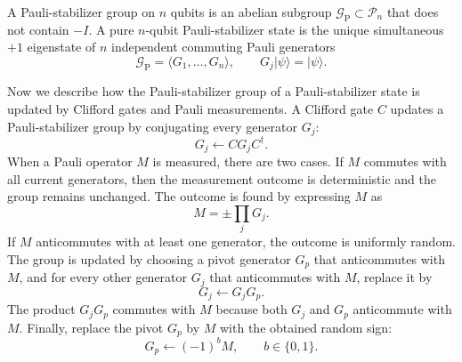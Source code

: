 \documentclass[
 reprint,
 amsmath,amssymb,
 pra,superscriptaddress, nofootinbib
]{revtex4-2}
\theoremstyle{definition}
\theoremstyle{plain}
\newcommand{\cP}{\mathcal P}
\begin{document}
A Pauli-stabilizer group on $n$ qubits is an abelian subgroup $\mathcal{G}_\mathrm{P}\subset\cP_n$ that does not contain $-I$. A pure $n$-qubit Pauli-stabilizer state is the unique simultaneous $+1$ eigenstate of $n$ independent commuting Pauli generators
\begin{equation}
\mathcal{G}_\mathrm{P}=\langle G_1,\ldots,G_n\rangle,
\qquad G_j|\psi\rangle=|\psi\rangle.
\end{equation}

Now we describe how the Pauli-stabilizer group of a Pauli-stabilizer state is updated by Clifford gates and Pauli measurements.
A Clifford gate $C$ updates a Pauli-stabilizer group by conjugating every generator $G_j$:
\begin{equation}
G_j\leftarrow CG_jC^{\dagger}.
\end{equation}
When a Pauli operator $M$ is measured, there are two cases. If $M$ commutes with all current generators, then the measurement outcome is deterministic and the group remains unchanged. The outcome is found by expressing $M$ as
\begin{equation}
M=\pm\prod_{j}G_j.
\label{eq:pauli_group_update_0}
\end{equation}
If $M$ anticommutes with at least one generator, the outcome is uniformly random. The group is updated by choosing a pivot generator $G_p$ that anticommutes with $M$, and for every other generator $G_j$ that anticommutes with $M$, replace it by
\begin{equation}
G_j\leftarrow G_jG_p.
\label{eq:pauli_group_update_1}
\end{equation}
The product $G_jG_p$ commutes with $M$ because both $G_j$ and $G_p$ anticommute with $M$. Finally, replace the pivot $G_p$ by $M$ with the obtained random sign:
\begin{equation}
G_p\leftarrow (-1)^b M,
\qquad b\in\{0,1\}.
\label{eq:pauli_group_update_2}
\end{equation}
\end{document}

